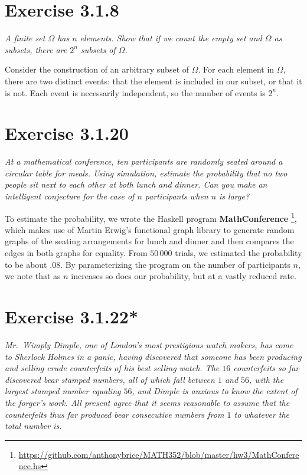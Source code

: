 \documentclass{tufte-handout}
\begin{document}
\section{Exercise 3.1.8}

\emph{A finite set $\Omega$ has $n$ elements. Show that if we
    count the empty set and $\Omega$ as subsets, there are $2^n$ subsets
    of $\Omega$.}

\bigskip

Consider the construction of an arbitrary subset of $\Omega$. For each
element in $\Omega$, there are two distinct events: that the element
is included in our subset, or that it is not. Each event is
necessarily independent, so the number of events is $2^n$.

\section{Exercise 3.1.20}

\emph{At a mathematical conference, ten participants are randomly
  seated around a circular table for meals. Using simulation, estimate
  the probability that no two people sit next to each other at both
  lunch and dinner. Can you make an intelligent conjecture for the
  case of $n$ participants when $n$ is large?}

\bigskip

To estimate the probability, we wrote the Haskell program
\textbf{MathConference}%
\footnote{\url{https://github.com/anthonybrice/MATH352/blob/master/hw3/MathConference.hs}},
which makes use of Martin Erwig's functional graph library to generate
random graphs of the seating arrangements for lunch and dinner and
then compares the edges in both graphs for equality. From $50\,000$
trials, we estimated the probability to be about $.08$. By
parameterizing the program on the number of participants $n$, we note
that as $n$ increases so does our probability, but at a vastly reduced
rate.

\section{Exercise 3.1.22*}

\emph{Mr.~Wimply Dimple, one of London's most prestigious watch
  makers, has come to Sherlock Holmes in a panic, having discovered
  that someone has been producing and selling crude counterfeits of
  his best selling watch. The $16$ counterfeits so far discovered bear
  stamped numbers, all of which fall between $1$ and $56$, with the
  largest stamped number equaling $56$, and Dimple is anxious to know
  the extent of the forger's work. All present agree that it seems
  reasonable to assume that the counterfeits thus far produced bear
  consecutive numbers from $1$ to whatever the total number is.}
\end{document}
